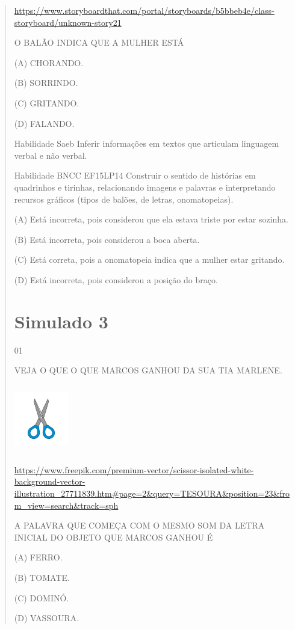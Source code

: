 {{{{\begin{verse}
{{\begin{escolha}
{{{{{\url{https://www.storyboardthat.com/portal/storyboards/b5bbeb4e/class-storyboard/unknown-story21}

O BALÃO INDICA QUE A MULHER ESTÁ

(A) CHORANDO.

(B) SORRINDO.

(C) GRITANDO.

(D) FALANDO.

Habilidade Saeb Inferir informações em textos que articulam linguagem
verbal e não verbal.

Habilidade BNCC EF15LP14 Construir o sentido de histórias em quadrinhos
e tirinhas, relacionando imagens e palavras e interpretando recursos
gráficos (tipos de balões, de letras, onomatopeias).

(A) Está incorreta, pois considerou que ela estava triste por estar
sozinha.

(B) Está incorreta, pois considerou a boca aberta.

(C) Está correta, pois a onomatopeia indica que a mulher estar gritando.

(D) Está incorreta, pois considerou a posição do braço.

\chapter{Simulado 3}

\num{01}

VEJA O QUE O QUE MARCOS GANHOU DA SUA TIA MARLENE.

\includegraphics[width=0.92708in,height=1.18125in]{media/image163.jpeg}

\url{https://www.freepik.com/premium-vector/scissor-isolated-white-background-vector-illustration_27711839.htm\#page=2\&query=TESOURA\&position=23\&from_view=search\&track=sph}

A PALAVRA QUE COMEÇA COM O MESMO SOM DA LETRA INICIAL DO OBJETO QUE
MARCOS GANHOU É

(A) FERRO.

(B) TOMATE.

(C) DOMINÓ.

(D) VASSOURA.

}}}}}
\end{escolha}}}
\end{verse}}}}}
